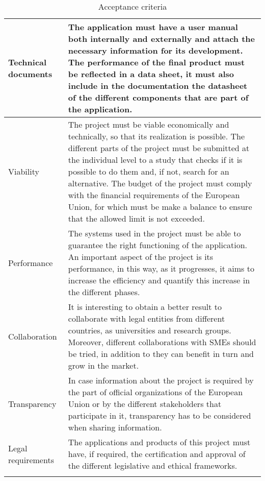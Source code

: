 \begin{longtable}[H]{ p{4cm} p{10.1cm} }
	Technical documents & The application must have a user manual both internally and externally and attach the necessary information for its development. 
	\newline
	The performance of the final product must be reflected in a data sheet, it must also include in the documentation the datasheet of the different components that are part of the application. \vspace{0.2cm}
	\\ \midrule

	Viability & The project must be viable economically and technically, so that its realization is possible. \newline
	The different parts of the project must be submitted at the individual level to a study that checks if it is possible to do them and, if not, search for an alternative. 
	\newline
	The budget of the project must comply with the financial requirements of the European Union, for which must be make a balance to ensure that the allowed limit is not exceeded. \vspace{0.2cm}
	\\ \midrule

	Performance & The systems used in the project must be able to guarantee the right functioning of the application. An important aspect of the project is its performance, in this way, as it progresses, it aims to increase the efficiency and quantify this increase in the different phases. \vspace{0.2cm}
	\\ \midrule
	
	Collaboration & It is interesting to obtain a better result to collaborate with legal entities from different countries, as universities and research groups. Moreover, different collaborations with SMEs should be tried, in addition to they can benefit in turn and grow in the market.	\vspace{0.2cm}
	\\ \midrule
	
	Transparency & In case information about the project is required by the part of official organizations of the European Union or by the different stakeholders that participate in it, transparency has to be considered when sharing information. \vspace{0.2cm}
	\\ \midrule

	Legal requirements & The applications and products of this project must have, if required, the certification and approval of the different legislative and ethical frameworks. \vspace{0.2cm}
	\\ \bottomrule[2pt]
	
	\caption{Acceptance criteria}

\end{longtable}


